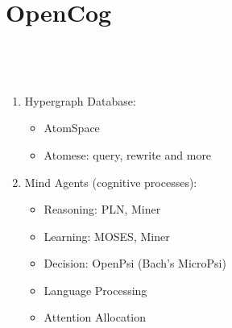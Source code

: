 \documentclass[aspectratio=169]{beamer}
\begin{document}
\section {OpenCog}

\begin{frame}





  \\[0.5cm]

  \begin{columns}
    \column{3in}
  
    \begin{enumerate}
    \item Hypergraph Database: 
      \begin{itemize}
      \item AtomSpace
      \item Atomese: query, rewrite and more
      \end{itemize}
    \item Mind Agents (cognitive processes):
      \begin{itemize}
      \item \alert{Reasoning: PLN, Miner}
      \item Learning: MOSES, Miner
      \item Decision: OpenPsi (Bach's MicroPsi)
      \item Language Processing
      \item Attention Allocation
      \end{itemize}
    \end{enumerate}

    \column{3in}


\end{columns}
\end{frame}
\end{document}
